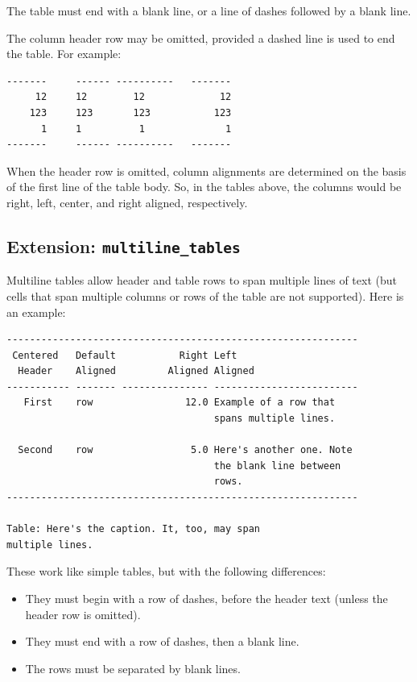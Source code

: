 \documentclass[
  b5paper
]{book}
\providecommand{\tightlist}{%
  \setlength{\itemsep}{0pt}\setlength{\parskip}{0pt}}
\begin{document}
The table must end with a blank line, or a line of dashes followed by a
blank line.

The column header row may be omitted, provided a dashed line is used to
end the table. For example:

\begin{verbatim}
-------     ------ ----------   -------
     12     12        12             12
    123     123       123           123
      1     1          1              1
-------     ------ ----------   -------
\end{verbatim}

When the header row is omitted, column alignments are determined on the
basis of the first line of the table body. So, in the tables above, the
columns would be right, left, center, and right aligned, respectively.

\subsection{\texorpdfstring{Extension:
\texttt{multiline\_tables}}{Extension: multiline\_tables}}\label{extension-multiline_tables}

Multiline tables allow header and table rows to span multiple lines of
text (but cells that span multiple columns or rows of the table are not
supported). Here is an example:

\begin{verbatim}
-------------------------------------------------------------
 Centered   Default           Right Left
  Header    Aligned         Aligned Aligned
----------- ------- --------------- -------------------------
   First    row                12.0 Example of a row that
                                    spans multiple lines.

  Second    row                 5.0 Here's another one. Note
                                    the blank line between
                                    rows.
-------------------------------------------------------------

Table: Here's the caption. It, too, may span
multiple lines.
\end{verbatim}

These work like simple tables, but with the following differences:

\begin{itemize}
\tightlist
\item
  They must begin with a row of dashes, before the header text (unless
  the header row is omitted).
\item
  They must end with a row of dashes, then a blank line.
\item
  The rows must be separated by blank lines.
\end{itemize}
\end{document}
